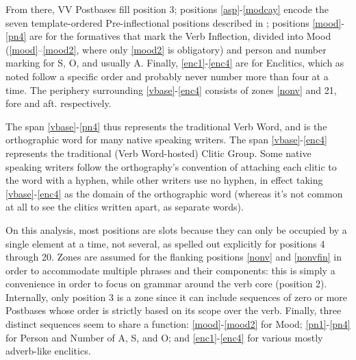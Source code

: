 \documentclass[output=paper]{langscibook}
\begin{document}
From there, VV Postbases fill position 3; positions \ref{asp}-\ref{modcay} encode the seven tem\-plate-ordered Pre-inflectional positions described in ; positions \ref{mood}-\ref{pn4} are for the formatives that mark the Verb Inflection, divided into Mood (\ref{mood}--\ref{mood2}, where only \ref{mood2} is obligatory) and person and number marking for S, O, and usually A. Finally, \ref{enc1}-\ref{enc4} are for Enclitics, which as noted follow a specific order and probably never number more than four at a time. The periphery surrounding \ref{vbase}-\ref{enc4} consists of zones \ref{nonv} and 21, fore and aft. respectively.

The span \ref{vbase}-\ref{pn4} thus represents the traditional Verb Word, and is the orthographic word for many native speaking writers. The span \ref{vbase}-\ref{enc4} represents the traditional (Verb Word-hosted) Clitic Group. Some native speaking writers follow the orthography's convention of attaching each clitic to the word with a hyphen, while other writers use no hyphen, in effect taking \ref{vbase}-\ref{enc4} as the domain of the orthographic word (whereas it's not common at all to see the clitics written apart, as separate words).

On this analysis, most positions are slots because they can only be occupied by a single element at a time, not several, as spelled out explicitly for positions 4 through 20. Zones are assumed for the flanking positions \ref{nonv} and \ref{nonvfin} in order to accommodate multiple phrases and their components: this is simply a convenience in order to focus on grammar around the verb core (position 2). Internally, only position 3 is a zone since it can include sequences of zero or more Postbases whose order is strictly based on its scope over the verb. Finally, three distinct sequences seem to share a function: \ref{mood}-\ref{mood2} for Mood; \ref{pn1}-\ref{pn4} for Person and Number of A, S, and O; and \ref{enc1}-\ref{enc4} for various mostly adverb-like enclitics.
\end{document}
